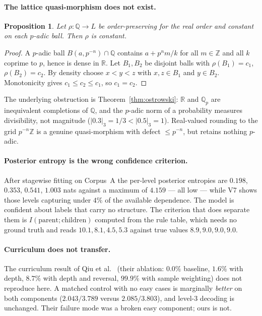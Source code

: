 \documentclass[11pt,a4paper]{article}
\theoremstyle{plain}
\newtheorem{proposition}[theorem]{Proposition}
\theoremstyle{definition}
\begin{document}
\paragraph{The lattice quasi-morphism does not exist.}

\begin{proposition}\label{prop:padic}
Let $\rho:\mathbb{Q}\to L$ be order-preserving for the real order and constant
on each $p$-adic ball. Then $\rho$ is constant.
\end{proposition}

\begin{proof}
A $p$-adic ball $B(a,p^{-n}) \cap \mathbb{Q}$ contains $a + p^n m/k$ for all
$m \in \mathbb{Z}$ and all $k$ coprime to $p$, hence is dense in $\mathbb{R}$.
Let $B_1, B_2$ be disjoint balls with $\rho(B_1)=c_1$, $\rho(B_2)=c_2$. By
density choose $x<y<z$ with $x,z\in B_1$ and $y\in B_2$. Monotonicity gives
$c_1 \le c_2 \le c_1$, so $c_1=c_2$.
\end{proof}

\noindent
The underlying obstruction is Theorem~\ref{thm:ostrowski}: $\mathbb{R}$ and
$\mathbb{Q}_p$ are inequivalent completions of $\mathbb{Q}$, and the $p$-adic
norm of a probability measures divisibility, not magnitude ($|0.3|_3 = 1/3 <
|0.5|_3 = 1$). Real-valued rounding to the grid $p^{-n}\mathbb{Z}$ is a genuine
quasi-morphism with defect $\le p^{-n}$, but retains nothing $p$-adic.

\paragraph{Posterior entropy is the wrong confidence criterion.}
After stagewise fitting on Corpus~A the per-level posterior entropies are
$0.198$, $0.353$, $0.541$, $1.003$ nats against a maximum of $4.159$ --- all
low --- while V7 shows those levels capturing under $4\%$ of the available
dependence. The model is confident about labels that carry no structure. The
criterion that does separate them is $I(\text{parent};\text{children})$
computed from the rule table, which needs no ground truth and reads
$10.1, 8.1, 4.5, 5.3$ against true values $8.9, 9.0, 9.0, 9.0$.

\paragraph{Curriculum does not transfer.}
The curriculum result of Qiu et al.~\cite{qiu2024} (their ablation: $0.0\%$
baseline, $1.6\%$ with depth, $8.7\%$ with depth and reversal, $99.9\%$ with
sample weighting) does not reproduce here. A matched control with no easy
cases is marginally \emph{better} on both components
($2.043/3.789$ versus $2.085/3.803$), and level-3 decoding is unchanged.
Their failure mode was a broken easy component; ours is not.
\end{document}
